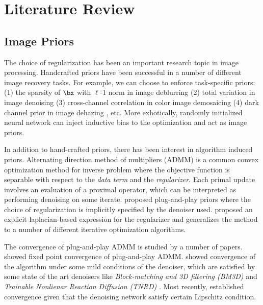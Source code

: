 \documentclass[11pt]{article}
\begin{document}
\section{Literature Review}

\subsection{Image Priors} 

The choice of regularization has been an important research topic in image processing. Handcrafted priors have been successful in a number of different image recovery tasks. For example, we can choose to enforce task-specific priors: (1) the sparsity of $\bx$ with $\ell$-1 norm in image deblurring \cite{beckFastIterativeShrinkageThresholding2009} (2) total variation in image denoising \cite{buadesNonlocalImageMovie2008} (3) cross-channel correlation in color image demosaicing \cite{malvarHighqualityLinearInterpolation2004} (4) dark channel prior in image dehazing \cite{fattalSingleImageDehazing2008}, etc. More exhotically, randomly initialized neural network can inject inductive bias to the optimization and act as image priors. \cite{ulyanovDeepImagePrior2017}

$ $\\
In addition to hand-crafted priors, there has been interest in algorithm induced priors. Alternating direction method of multipliers (ADMM) is a common convex optimization method for inverse problem where the objective function is separable with respect to the \textit{data term} and the \textit{regularizer}. Each primal update involves an evaluation of a proximal operator, which can be interpreted as performing denoising on some iterate. \cite{venkatakrishnanPlugandPlayPriorsModel2013,heideFlexISPFlexibleCamera2014,chanAlgorithmInducedPriorImage2016} proposed plug-and-play priors where the choice of regularization is implicitly specified by the denoiser used. \cite{romanoLittleEngineThat2016} proposed an explicit laplacian-based expression for the regularizer and generalizes the method to a number of different iterative optimization algorithms.

$ $\\
The convergence of plug-and-play ADMM is studied by a number of papers. \cite{chanPlugandPlayADMMImage2016} showed fixed point convergence of plug-and-play ADMM. \cite{romanoLittleEngineThat2016} showed convergence of the algorithm under some mild conditions of the denoiser, which are satisfied by some state of the art denoisers like \textit{Block-matching and 3D filtering
 (BM3D)} \cite{dabovImageDenoisingSparse2007} and \textit{Trainable Nonlienar Reaction Diffusion (TNRD)} \cite{chenTrainableNonlinearReaction2017}. Most recently, \cite{ryuPlugandPlayMethodsProvably2019} established convergence given that the denoising network satisfy certain Lipschitz condition.
\end{document}
